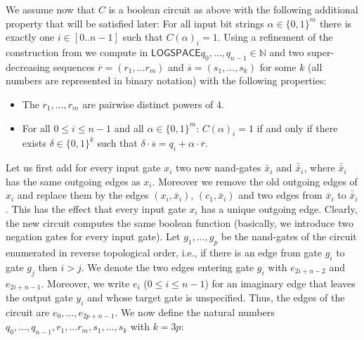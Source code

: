 \documentclass[10pt,a4paper]{article}
\newcommand{\cointerval}[2]{[{#1}..{#2}-1]}
\renewcommand{\L}{\ensuremath{\mathsf{LOGSPACE}}\xspace}
\begin{document}
We assume now that $C$ is a boolean circuit as above with the 
 following additional property that will be satisfied later: For all input bit strings $\alpha \in \{0,1\}^m$ there is exactly
one $i \in \cointerval{0}{n}$ such that $C(\alpha)_i=1$. Using a refinement of the construction from \cite{ref30}
we compute in \L $q_{0}, \ldots, q_{n-1} \in \mathbb{N}$ and two super-decreasing sequences 
$\overline{r} = (r_1, \ldots r_m)$ and $\overline{s} = (s_1, \ldots, s_k)$ for some $k$ (all numbers are represented in binary notation) with the following properties:
\begin{itemize}
\item The $r_1, \ldots, r_m$ are pairwise distinct powers of $4$. 
\item For all $0 \leq i \leq n-1$ and all $\alpha \in \{0,1\}^m$:
$C(\alpha)_i = 1$  if and only if there exists
$\delta \in \{0,1\}^k$ such that $\delta \cdot \overline{s} = q_i + \alpha \cdot \overline{r}$. 
\end{itemize}
Let us first add for every input gate $x_i$ two new {\sf nand}-gates
${\bar x}_i$ and ${\bar{\bar x}}_i$, where ${\bar{\bar x}}_i$ has the same outgoing edges as $x_i$. Moreover we remove the old outgoing edges of $x_i$
and replace them by the edges $(x_i, {\bar x}_i)$, $(c_1, {\bar x}_i)$ and two edges from ${\bar x}_i$ to ${\bar{\bar x}}_i$.
This has the effect that every input gate $x_i$ has a unique outgoing edge. Clearly, the new circuit computes the same
boolean function (basically, we introduce two negation gates for every input gate).
Let $g_1, \ldots, g_p$ be the {\sf nand}-gates of the circuit enumerated in reverse topological
order, i.e., if there is an edge from gate $g_i$ to gate $g_j$ then $i>j$. We denote the two edges entering gate
$g_i$ with $e_{2i+n-2}$ and $e_{2i+n-1}$. Moreover, we write $e_i$ ($0 \leq i \leq n-1$) for an imaginary edge
that leaves the output gate $y_{i}$ and whose target gate is unspecified. Thus, the edges of the circuit are 
$e_0,\ldots, e_{2p+n-1}$.
We now define the natural numbers $q_{0}, \ldots, q_{n-1}, r_1, \ldots r_m,s_1, \ldots, s_k$ with $k = 3p$:
\end{document}
